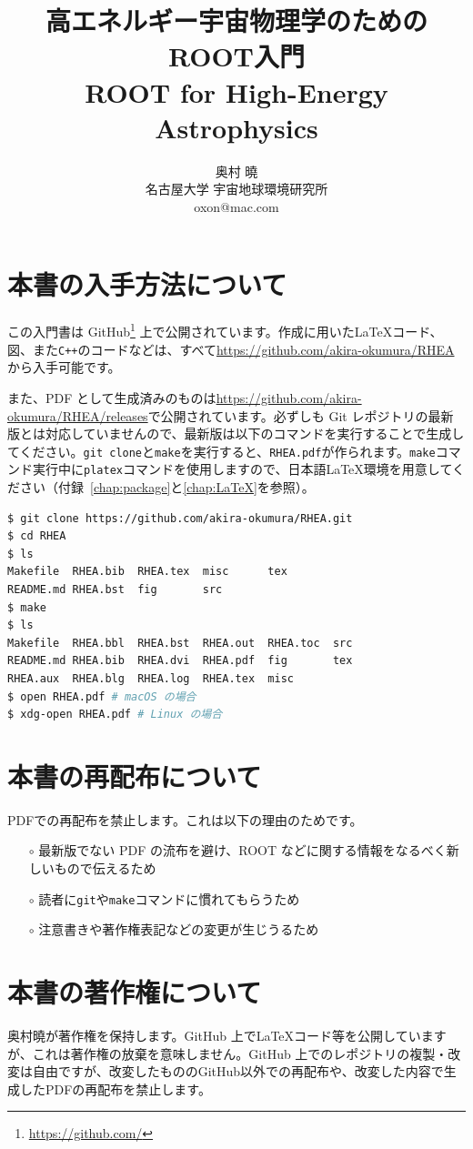 \documentclass[oneside,uplatex]{jsbook}
\title{{\huge 高エネルギー宇宙物理学のためのROOT入門\\ROOT for High-Energy Astrophysics}}
\author{{\Large 奥村 曉} \\ 名古屋大学 宇宙地球環境研究所 \\ oxon@mac.com}
\makeatletter
\def\@listoflistenv{[NoFloat][listings][lstlisting]}
\newif\if@expire@floats \@expire@floatsfalse
\def\begin#1{%
   \@ifundefined{#1}%
      {\def\reserved@a{\@latex@error{Environment #1 undefined}\@eha}}%
      {\def\reserved@a{\def\@currenvir{#1}%
          \edef\@currenvline{\on@line}%
          \@check@listenv
          \csname #1\endcsname}}%
       \@ignorefalse
   \begingroup\@endpefalse\reserved@a}
\def\@check@listenv{%
   \@expandtwoargs\in@{[\@currenvir]}{\@listoflistenv}%
   \ifin@ \@expire@floatstrue \fi}
\makeatother
\begin{document}
\maketitle
\frontmatter
\section*{本書の入手方法について}
この入門書は GitHub\footnote{\url{https://github.com/}} 上で公開されています。作成に用いた\LaTeX コード、図、また\texttt{C++}のコードなどは、すべて\url{https://github.com/akira-okumura/RHEA}から入手可能です。

また、PDF として生成済みのものは\url{https://github.com/akira-okumura/RHEA/releases}で公開されています。必ずしも Git レポジトリの最新版とは対応していませんので、最新版は以下のコマンドを実行することで生成してください。\texttt{git clone}と\texttt{make}を実行すると、\texttt{RHEA.pdf}が作られます。\texttt{make}コマンド実行中に\texttt{platex}コマンドを使用しますので、日本語\LaTeX 環境を用意してください（付録~\ref{chap:package}と\ref{chap:LaTeX}を参照）。

\begin{lstlisting}[language=bash]
$ git clone https://github.com/akira-okumura/RHEA.git
$ cd RHEA
$ ls
Makefile  RHEA.bib  RHEA.tex  misc      tex
README.md RHEA.bst  fig       src
$ make
$ ls
Makefile  RHEA.bbl  RHEA.bst  RHEA.out  RHEA.toc  src
README.md RHEA.bib  RHEA.dvi  RHEA.pdf  fig       tex
RHEA.aux  RHEA.blg  RHEA.log  RHEA.tex  misc
$ open RHEA.pdf # macOS の場合
$ xdg-open RHEA.pdf # Linux の場合
\end{lstlisting}

\section*{本書の再配布について}
PDFでの再配布を禁止します。これは以下の理由のためです。
\begin{itemize}
\item[$\circ$]最新版でない PDF の流布を避け、ROOT などに関する情報をなるべく新しいもので伝えるため
\item[$\circ$]読者に\texttt{git}や\texttt{make}コマンドに慣れてもらうため
\item[$\circ$]注意書きや著作権表記などの変更が生じうるため
\end{itemize}

\section*{本書の著作権について}
奥村曉が著作権を保持します。GitHub 上で\LaTeX コード等を公開していますが、これは著作権の放棄を意味しません。GitHub 上でのレポジトリの複製・改変は自由ですが、改変したもののGitHub以外での再配布や、改変した内容で生成したPDFの再配布を禁止します。
\end{document}
